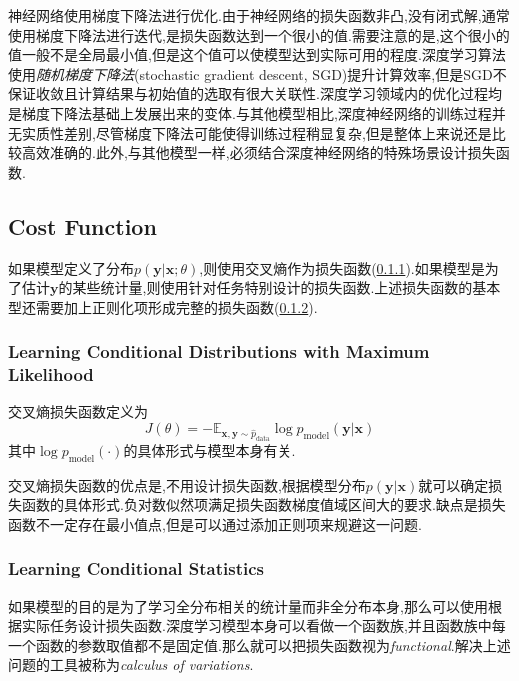神经网络使用梯度下降法进行优化.由于神经网络的损失函数非凸,没有闭式解,通常使用梯度下降法进行迭代,是损失函数达到一个很小的值.需要注意的是,这个很小的值一般不是全局最小值,但是这个值可以使模型达到实际可用的程度.深度学习算法使用\textit{随机梯度下降法}(stochastic gradient descent, SGD)提升计算效率,但是SGD不保证收敛且计算结果与初始值的选取有很大关联性.深度学习领域内的优化过程均是梯度下降法基础上发展出来的变体.与其他模型相比,深度神经网络的训练过程并无实质性差别,尽管梯度下降法可能使得训练过程稍显复杂,但是整体上来说还是比较高效准确的.此外,与其他模型一样,必须结合深度神经网络的特殊场景设计损失函数.

\subsection{Cost Function}

如果模型定义了分布$p(\mathbf y|\mathbf x;\theta)$,则使用交叉熵作为损失函数(\ref{sec:cost_func_distribution}).如果模型是为了估计$\mathbf y$的某些统计量,则使用针对任务特别设计的损失函数.上述损失函数的基本型还需要加上正则化项形成完整的损失函数(\ref{sec:cost_func_statistics}).

\subsubsection{Learning Conditional Distributions with Maximum Likelihood}\label{sec:cost_func_distribution}

交叉熵损失函数定义为
\begin{equation}
J(\theta)=-\mathbb E_{\mathbf{x,y}\sim\hat p_{\text{data}}}\log p_{\text{model}}(\mathbf y|\mathbf x)
\end{equation}
其中$\log p_{\text{model}}(\cdot)$的具体形式与模型本身有关.

交叉熵损失函数的优点是,不用设计损失函数,根据模型分布$p(\mathbf y|\mathbf x)$就可以确定损失函数的具体形式.负对数似然项满足损失函数梯度值域区间大的要求.缺点是损失函数不一定存在最小值点,但是可以通过添加正则项来规避这一问题.

\subsubsection{Learning Conditional Statistics}\label{sec:cost_func_statistics}

如果模型的目的是为了学习全分布相关的统计量而非全分布本身,那么可以使用根据实际任务设计损失函数.深度学习模型本身可以看做一个函数族,并且函数族中每一个函数的参数取值都不是固定值.那么就可以把损失函数视为\textit{functional}.解决上述问题的工具被称为\textit{calculus of variations}.


